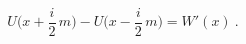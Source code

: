 \begin{equation}
  \label{eq:U}
  U\Big(x+\frac i2\,m\Big)-U\Big(x-\frac i2\,m\Big) = W'(x)\ .
\end{equation}

